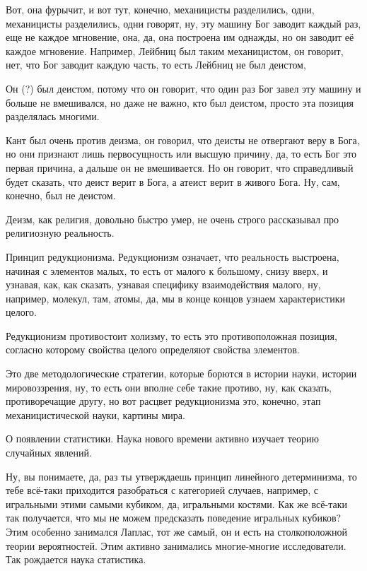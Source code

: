 Вот, она фурычит, и вот тут, конечно, механицисты разделились,
одни, механицисты разделились, одни говорят, ну, эту машину Бог заводит каждый
раз, еще не каждое мгновение, она, да, она построена им однажды, но он заводит
её каждое мгновение. Например, Лейбниц был таким механицистом, он говорит, нет,
что Бог заводит каждую часть, то есть Лейбниц не был деистом, 

Он (?) был деистом, потому
что он говорит, что один раз Бог завел эту машину и больше не вмешивался, но
даже не важно, кто был деистом, просто эта позиция разделялась многими. 

Кант был
очень против деизма, он говорил, что деисты не отвергают веру в Бога, но они
признают лишь первосущность или высшую причину, да, то есть Бог это первая
причина, а дальше он не вмешивается. Но он говорит, что справедливый будет
сказать, что деист верит в Бога, а атеист верит в живого Бога. Ну, сам, конечно,
был не деистом. 

Деизм, как
религия, довольно быстро умер, не очень строго
рассказывал про религиозную реальность. 

Принцип редукционизма. 
Редукционизм означает, что реальность выстроена, начиная с элементов малых, то
есть от малого к большому, снизу вверх, и узнавая, как, как сказать, узнавая
специфику взаимодействия малого, ну, например, молекул, там, атомы, да, мы в
конце концов узнаем характеристики целого. 

Редукционизм противостоит холизму, то
есть это противоположная позиция, согласно которому свойства целого определяют
свойства элементов. 

Это две методологические стратегии, которые борются в
истории науки, истории мировоззрения, ну, то есть они вполне себе такие противо,
ну, как сказать, противоречащие другу, но вот расцвет редукционизма это,
конечно, этап механицистической науки, картины мира. 

О появлении статистики. Наука нового времени активно изучает
теорию случайных явлений. 

Ну, вы понимаете, да, раз ты утверждаешь принцип
линейного детерминизма, то тебе всё-таки приходится разобраться с категорией
случаев, например, с игральными этими самыми кубиком, да, игральными костями.
Как же всё-таки так получается, что мы не можем предсказать поведение игральных
кубиков? Этим особенно занимался Лаплас, тот же самый, он и есть на
столкоположной теории вероятностей. Этим активно занимались многие-многие
исследователи. Так рождается наука статистика. 


